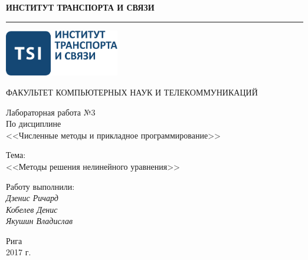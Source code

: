 \documentclass[a4paper]{article}
\begin{document}
% 
\begin{titlepage}
    \begin{center}
        \setlength{\parindent}{0cm}
        \fontsize{16pt}{16pt}\selectfont

        \textbf{ИНСТИТУТ ТРАНСПОРТА И СВЯЗИ}

        \rule{\textwidth}{1pt}

        \vspace*{2.0cm}

        \includegraphics[width=5cm]{../../tsi_logo}

        \vspace*{2.0cm}

        ФАКУЛЬТЕТ КОМПЬЮТЕРНЫХ НАУК И ТЕЛЕКОММУНИКАЦИЙ

        \vspace*{2.0cm}

        Лабораторная работа №3 \\
        По дисциплине \\
        <<Численные методы и прикладное программирование>>

        \vspace*{2.0cm}
        \fontsize{14pt}{14pt}\selectfont
        Тема: \\
        <<Методы решения нелинейного уравнения>>

        \vfill
        \fontsize{12pt}{12pt}\selectfont

        \begin{flushright}
            Работу выполнили: \\
            \vspace*{0.25cm}
            {\itshape Дзенис Ричард} \\
            {\itshape Кобелев Денис} \\
            {\itshape Якушин Владислав} \\
        \end{flushright}

        \vfill

        Рига \\ 2017 г.
    \end{center}
\end{titlepage}

\tableofcontents
\end{document}
